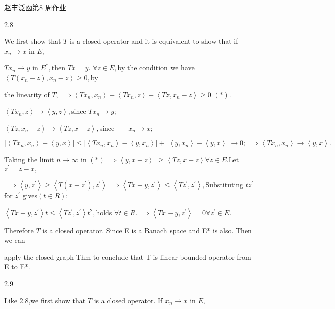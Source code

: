 \documentclass{article}
\begin{document}
\bigskip 赵丰\qquad 泛函第8%
周作业

2.8

We first show that $T$ is a closed operator and it is equivalent to show
that if $x_{n}\rightarrow x$ in $E,$

$Tx_{n}\rightarrow y$ in $E^{\ast },$then $Tx=y.$ $\forall z\in E,$by the
condition we have $\left\langle T(x_{n}-z),x_{n}-z\right\rangle \geq 0,$by

the linearity of $T,\implies \left\langle Tx_{n},x_{n}\right\rangle
-\left\langle Tx_{n},z\right\rangle -\left\langle Tz,x_{n}-z\right\rangle
\geq 0$ $\left( \ast \right) .$

$\left\langle Tx_{n},z\right\rangle \rightarrow \left\langle
y,z\right\rangle ,$since $Tx_{n}\rightarrow y;$

$\left\langle Tz,x_{n}-z\right\rangle \rightarrow \left\langle
Tz,x-z\right\rangle ,$since$\qquad x_{n}\rightarrow x;$

$\left\vert \left\langle Tx_{n},x_{n}\right\rangle -\left\langle
y,x\right\rangle \right\vert \leq \left\vert \left\langle
Tx_{n},x_{n}\right\rangle -\left\langle y,x_{n}\right\rangle \right\vert
+\left\vert \left\langle y,x_{n}\right\rangle -\left\langle y,x\right\rangle
\right\vert \rightarrow 0;\implies \left\langle Tx_{n},x_{n}\right\rangle
\rightarrow \left\langle y,x\right\rangle .$

Taking the limit $n\rightarrow \infty $ in $\left( \ast \right) \implies
\left\langle y,x-z\right\rangle $ $\geq \left\langle Tz,x-z\right\rangle
\forall z\in E.$Let $z^{\prime }=z-x,$

$\implies \left\langle y,z^{\prime }\right\rangle \geq \left\langle T\left(
x-z^{\prime }\right) ,z^{\prime }\right\rangle \implies \left\langle
Tx-y,z^{\prime }\right\rangle \leq \left\langle Tz^{\prime },z^{\prime
}\right\rangle ,$Substituting $tz^{\prime }$ for $z^{\prime }$ gives$\left(
t\in R\right) $:

$\left\langle Tx-y,z^{\prime }\right\rangle t\leq \left\langle Tz^{\prime
},z^{\prime }\right\rangle t^{2},$holds $\forall t\in R.\implies
\left\langle Tx-y,z^{\prime }\right\rangle =0\forall z^{\prime }\in E.$

Therefore $T$ is a closed operator. Since E is a Banach space and E* is
also. Then we can

apply the closed graph Thm to conclude that T is linear bounded operator
from E to E*.

2.9

Like 2.8,we first show that $T$ is a closed operator. If $x_{n}\rightarrow x$
in $E,$
\end{document}
